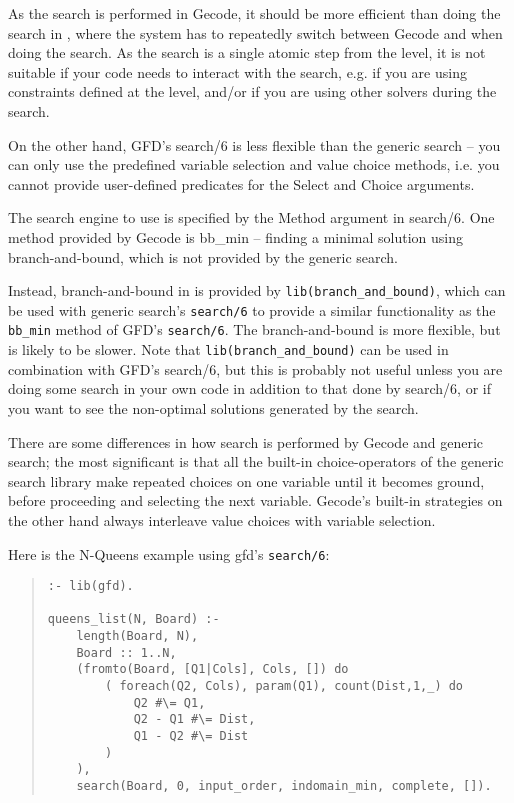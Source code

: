 As the search is performed in Gecode, it should be more efficient than doing
the search in \eclipse, where the system has to repeatedly switch between
Gecode and {\eclipse} when doing the search. As the search is a single atomic
step from the {\eclipse} level, it is not suitable if your code needs to
interact with the search, e.g. if you are using constraints defined at the
{\eclipse} level, and/or if you are using other solvers during the search.

On the other hand, GFD's search/6 is less flexible than the generic search
-- you can only use the predefined variable 
selection and value choice methods, i.e. you cannot provide user-defined
predicates for the Select and Choice arguments. 

The search engine to use is specified by the Method argument in search/6. 
One method provided by Gecode is bb_min -- finding a minimal solution using
branch-and-bound, which is not provided by the generic search. 

Instead, branch-and-bound in {\eclipse} is provided by {\tt lib(branch_and_bound)}, which can
be used with generic search's {\tt search/6} to provide a similar functionality as
the {\tt bb_min} method of GFD's {\tt search/6}. The {\eclipse} branch-and-bound is more 
flexible, but is likely to be slower. Note that {\tt lib(branch_and_bound)} can
be used in combination with GFD's search/6, but this is probably not useful
unless you are doing some search in your own code in addition to that done by 
search/6, or if you want to see the non-optimal solutions generated by the
search.

There are some differences in how search is performed by Gecode and generic
search;
the most significant is that all the built-in choice-operators of the generic
search library make repeated choices on one variable until it becomes ground,
before proceeding and selecting the next variable.  Gecode's built-in
strategies on the other hand always interleave value choices with variable
selection.

Here is the N-Queens example using gfd's \texttt{search/6}:
\begin{quote}
\begin{verbatim}
:- lib(gfd).

queens_list(N, Board) :-
    length(Board, N),
    Board :: 1..N,
    (fromto(Board, [Q1|Cols], Cols, []) do
        ( foreach(Q2, Cols), param(Q1), count(Dist,1,_) do
            Q2 #\= Q1,
            Q2 - Q1 #\= Dist,
            Q1 - Q2 #\= Dist
        )
    ),
    search(Board, 0, input_order, indomain_min, complete, []).
\end{verbatim}
\end{quote}


